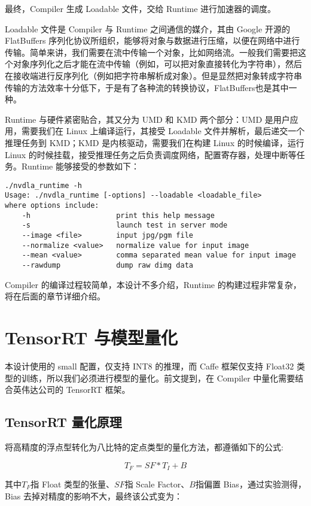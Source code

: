 最终，Compiler 生成 Loadable 文件，交给 Runtime 进行加速器的调度。

Loadable 文件是 Compiler 与 Runtime 之间通信的媒介，其由 Google 开源的 FlatBuffers 序列化协议所组织，能够将对象与数据进行压缩，以便在网络中进行传输。简单来讲，我们需要在流中传输一个对象，比如网络流。一般我们需要把这个对象序列化之后才能在流中传输（例如，可以把对象直接转化为字符串），然后在接收端进行反序列化（例如把字符串解析成对象）。但是显然把对象转成字符串传输的方法效率十分低下，于是有了各种流的转换协议，FlatBuffers也是其中一种。

Runtime 与硬件紧密贴合，其又分为 UMD 和 KMD 两个部分：UMD 是用户应用，需要我们在 Linux 上编译运行，其接受 Loadable 文件并解析，最后递交一个推理任务到 KMD；KMD 是内核驱动，需要我们在构建 Linux 的时候编译，运行 Linux 的时候挂载，接受推理任务之后负责调度网络，配置寄存器，处理中断等任务。Runtime 能够接受的参数如下：

\begin{lstlisting}
./nvdla_runtime -h
Usage: ./nvdla_runtime [-options] --loadable <loadable_file>
where options include:
    -h                    print this help message
    -s                    launch test in server mode
    --image <file>        input jpg/pgm file
    --normalize <value>   normalize value for input image
    --mean <value>        comma separated mean value for input image
    --rawdump             dump raw dimg data
\end{lstlisting}

Compiler 的编译过程较简单，本设计不多介绍，Runtime 的构建过程非常复杂，将在后面的章节详细介绍。

\section{TensorRT 与模型量化}

本设计使用的 small 配置，仅支持 INT8 的推理，而 Caffe 框架仅支持 Float32 类型的训练，所以我们必须进行模型的量化。前文提到，在 Compiler 中量化需要结合英伟达公司的 TensorRT 框架。

\subsection{TensorRT 量化原理}

将高精度的浮点型转化为八比特的定点类型的量化方法，都遵循如下的公式:

$$ T_F = SF * T_I + B $$


其中$T_F$指 Float 类型的张量、$SF$指 Scale Factor、$B$指偏置 Bias，通过实验测得，Bias 去掉对精度的影响不大，最终该公式变为：

